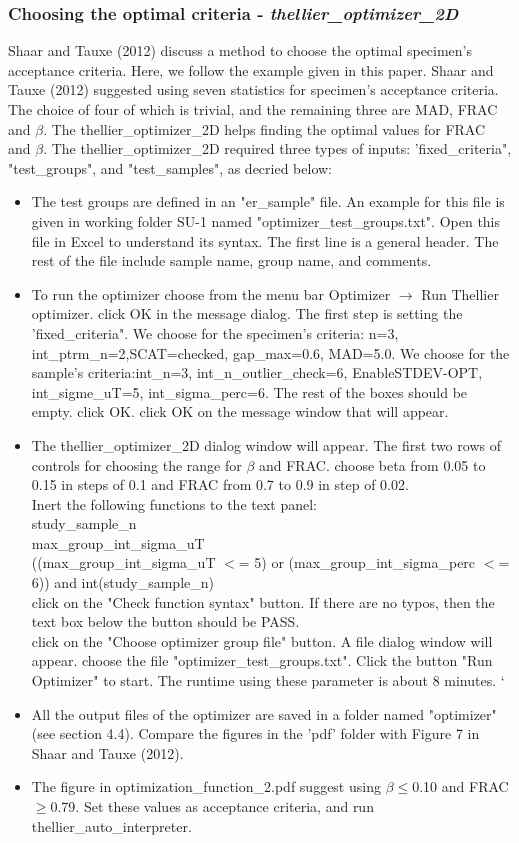 \documentclass[12pt]{article}
\begin{document}
\subsubsection{Choosing the optimal criteria - \it{thellier\_optimizer\_2D}}
Shaar and Tauxe (2012) discuss a method to choose the optimal specimen's acceptance criteria. Here, we follow the example given in this paper. Shaar and Tauxe (2012) suggested using  seven statistics for specimen's acceptance criteria. The choice of four of which is trivial, and the remaining three are MAD, FRAC and $\beta$. The thellier\_optimizer\_2D helps finding the optimal values for FRAC and $\beta$.  The thellier\_optimizer\_2D  required three types of inputs: 'fixed\_criteria", "test\_groups", and "test\_samples", as decried below:  
\begin{itemize}
\item The test groups are defined in an "er\_sample" file. An example for this file is given in working folder SU-1 named  "optimizer\_test\_groups.txt". Open this file in Excel to understand its syntax. The first line is a general header. The rest of the file include sample name, group name, and comments. 
\item To run the optimizer choose from the menu bar Optimizer $\rightarrow$ Run Thellier optimizer. click OK in the  message dialog. The first step is setting the 'fixed\_criteria". We choose for the specimen's criteria: n=3, int\_ptrm\_n=2,SCAT=checked, gap\_max=0.6, MAD=5.0. We choose for the sample's criteria:int\_n=3, int\_n\_outlier\_check=6, EnableSTDEV-OPT, int\_sigme\_uT=5, int\_sigma\_perc=6. The rest of the boxes should be empty. click OK. click OK on the message window that will appear.
\item The thellier\_optimizer\_2D dialog window will appear. The first two rows of controls for choosing the range for $\beta$ and FRAC. choose beta from 0.05 to 0.15 in steps of 0.1 and FRAC from 0.7 to 0.9 in step of 0.02. \\
Inert the following functions to the text panel:\\
study\_sample\_n\\
max\_group\_int\_sigma\_uT\\
((max\_group\_int\_sigma\_uT $<$= 5) or (max\_group\_int\_sigma\_perc $<$= 6)) and  int(study\_sample\_n) \\
click on the "Check function syntax" button. If there are no typos, then the text box below the button should be PASS.\\
click on the "Choose optimizer group file" button. A file dialog window will appear. choose the file "optimizer\_test\_groups.txt". Click the button "Run Optimizer" to start. The runtime using these parameter is about 8 minutes. `
\item All the output files of the optimizer are saved in a folder named "optimizer" (see section 4.4). Compare the figures in the 'pdf' folder with Figure 7 in Shaar and Tauxe (2012).  
\item The figure in optimization\_function\_2.pdf suggest using $\beta \leq$0.10 and FRAC  $ \geq $0.79. Set these values as acceptance criteria, and run thellier\_auto\_interpreter.  

\end{itemize}
\end{document}
